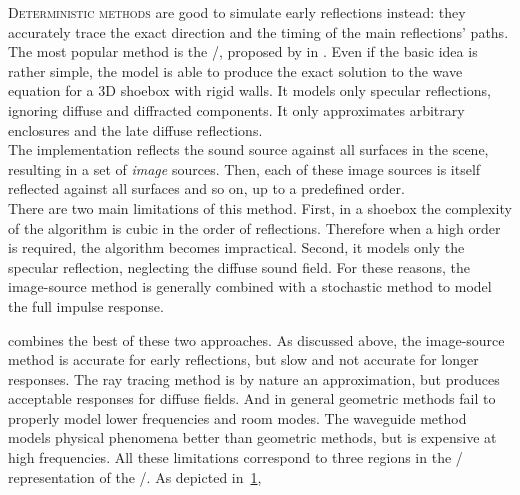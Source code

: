 \mynewline
\textsc{Deterministic methods} are good to simulate early reflections instead:
they accurately trace the exact direction and the timing of the main reflections' paths.
The most popular method is the \ISMdef/, proposed by \citeauthor{allen1979image} in .
Even if the basic idea is rather simple, the model is able to produce the exact solution to the wave equation for a 3D shoebox with rigid walls.
It models only specular reflections, ignoring diffuse and diffracted components.
It only approximates arbitrary enclosures and the late diffuse reflections.
\\The implementation reflects the sound source against all surfaces in the scene, resulting in a set of \textit{image} sources.
Then, each of these image sources is itself reflected against all surfaces and so on, up to a predefined order.
\\There are two main limitations of this method.
First, in a shoebox the complexity of the algorithm is cubic in the order of reflections.
Therefore when a high order is required, the algorithm becomes impractical.
Second, it models only the specular reflection, neglecting the diffuse sound field.
For these reasons, the image-source method is generally combined with a stochastic method to model the full impulse response.

 combines the best of these two approaches.
As discussed above, the image-source method is accurate for early reflections, but slow and not accurate for longer responses.
The ray tracing method is by nature an approximation, but produces acceptable responses for diffuse fields.
And in general geometric methods fail to properly model lower frequencies and room modes.
The waveguide method models physical phenomena better than geometric methods, but is expensive at high frequencies.
All these limitations correspond to three regions in the \TFdef/ representation of the \RIR/.
As depicted in~\cref{fig:acoustics:rir_regions},

\begin{figure}[t]
    \begin{fullwidth}

        \resizebox{\linewidth}{!}{
            
            }
            \label{fig:acoustics:rir_regions}
    \end{fullwidth}
\end{figure}

